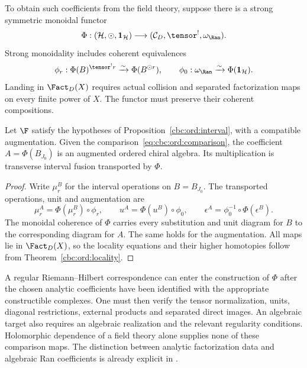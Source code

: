 To obtain such coefficients from the field theory, suppose there
is a strong symmetric monoidal functor
\begin{equation}
 \Phi:(\mathcal H,\odot,\mathbf1_{\mathcal H})
       \longrightarrow(\mathcal C_D,\tensor^!,\omega_{\Ran}).
 \label{eq:cbc:ord:comparison}
\end{equation}
Strong monoidality includes coherent equivalences
\[
 \phi_r:\Phi(B)^{\tensor^!r}\xrightarrow{\sim}\Phi(B^{\odot r}),
 \qquad
 \phi_0:\omega_{\Ran}\xrightarrow{\sim}\Phi(\mathbf1_{\mathcal H}).
\]
Landing in $\Fact_D(X)$ requires actual collision and separated
factorization maps on every finite power of $X$.
The functor must preserve their coherent compositions.

\begin{theorem}
\label{cbc:ord:recognition}
Let $\F$ satisfy the hypotheses of
Proposition~\ref{cbc:ord:interval}, with a compatible augmentation.
Given the comparison~\eqref{eq:cbc:ord:comparison}, the coefficient
$A=\Phi(B_{J_0})$ is an augmented ordered chiral algebra.
Its multiplication is transverse interval fusion transported by $\Phi$.
\end{theorem}
\begin{proof}
Write $\mu_r^B$ for the interval operations on $B=B_{J_0}$.
The transported operations, unit and augmentation are
\[
 \mu_r^A=\Phi(\mu_r^B)\circ\phi_r,\qquad
 u^A=\Phi(u^B)\circ\phi_0,\qquad
 \epsilon^A=\phi_0^{-1}\circ\Phi(\epsilon^B).
\]
The monoidal coherence of $\Phi$ carries every substitution and
unit diagram for $B$ to the corresponding diagram for $A$.
The same holds for the augmentation.
All maps lie in $\Fact_D(X)$, so the locality equations and their
higher homotopies follow from Theorem~\ref{cbc:ord:locality}.
\end{proof}

A regular Riemann--Hilbert correspondence can enter the construction
of $\Phi$ after the chosen analytic coefficients have been identified
with the appropriate constructible complexes.
One must then verify the tensor normalization, units, diagonal
restrictions, external products and separated direct images.
An algebraic target also requires an algebraic realization and the
relevant regularity conditions.
Holomorphic dependence of a field theory alone supplies none of
these comparison maps.
The distinction between analytic factorization data and algebraic
Ran coefficients is already explicit in \cite[2014 preprint, \S3.3.1]{CG1}.

